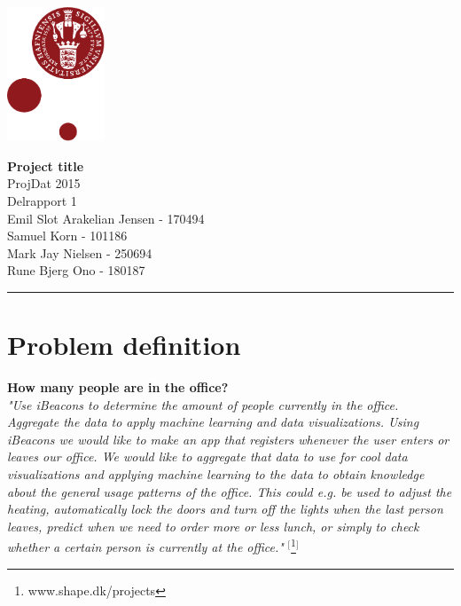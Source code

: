 \documentclass[12pt]{article}
\begin{document}
\begin{minipage}[b]{1.0\linewidth} 
\includegraphics[height=40mm]{KULogo}

\vspace*{-30ex}
\begin{center}
    {\Large \bf Project title} \vspace*{1ex} \\
    {\large ProjDat 2015} \vspace*{1ex} \\
    {\large Delrapport 1} \vspace*{1ex} \\
    {\large Emil Slot Arakelian Jensen - 170494} \vspace*{1ex}\\
    {\large Samuel Korn - 101186} \vspace*{1ex}\\
    {\large Mark Jay Nielsen - 250694} \vspace*{1ex}\\
    {\large Rune Bjerg Ono - 180187} \vspace*{1ex}\\
\end{center}

\vspace*{-3pt}
{\color{KU-red}\hrule}
\end{minipage}

\newpage
\tableofcontents

\newpage
\section{Problem definition}
\textbf{How many people are in the office?}\\

\textit{"Use iBeacons to determine the amount of people currently in the office. Aggregate the data to apply machine learning and data visualizations.
Using iBeacons we would like to make an app that registers whenever the user enters or leaves our office. We would like to aggregate that data to use for cool data visualizations and applying machine learning to the data to obtain knowledge about the general usage patterns of the office. This could e.g. be used to adjust the heating, automatically lock the doors and turn off the lights when the last person leaves, predict when we need to order more or less lunch, or simply to check whether a certain person is currently at the office."} $^[$\footnote{www.shape.dk/projects}$^]$\\
\end{document}
